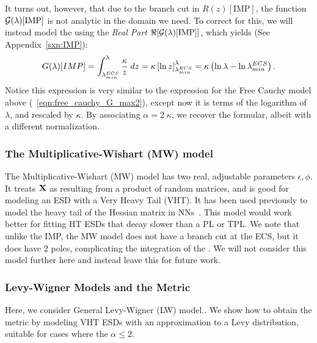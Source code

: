 It turns out, however, that due to the branch cut in $R(z)[\mathrm{IMP}]$,
the function $\mathcal{G(\lambda)}[\mathrm{IMP}]$ is not analytic in the domain we need. 
To correct for this, we will instead model the \LayerQualitySquared using the \emph{Real Part} $\Re[\mathcal{G(\lambda)}[\mathrm{IMP}]]$,
which yields (See Appendix~\ref{sxn:IMP}):
\begin{equation}
  \label{eqn:IMP_model_2}
G(\lambda)[IMP] = \int_{\lambda^{ECS}_{min}}^\lambda \frac{\kappa}{z}\;dz = \kappa \left[ \ln z \right]_{\lambda^{ECS}_{min}}^\lambda = \kappa \left( \ln \lambda - \ln \lambda^{ECS}_{min}\right).
\end{equation}
Notice this expression is very similar to the expression for the Free Cauchy model above (\EQN~\ref{eqn:free_cauchy_G_max2}), except
now it is terms of the logarithm of $\lambda$, and rescaled by $\kappa$.
By associating $\alpha=2\;\kappa$, we recover the \ALPHAHAT formular, albeit with a different normalization.

\subsubsection{The Multiplicative-Wishart (MW) model}
The Multiplicative-Wishart (MW) model  has two real, adjustable parameters $\epsilon,\phi$.
It treats $\mathbf{X}$ as resulting from a product of random matrices, and is good for modeling an ESD with a Very Heavy Tail (VHT).
It has been used previously to model the heavy tail of the Hessian matrix in NNs~\cite{PW16_NIPS}.
This model would work better for fitting HT ESDs that decay slower than a PL or TPL.
We note that unlike the IMP, the MW model does not have a branch cut at the ECS, but it does
have $2$ poles, complicating the integration of the \RTransform.
We will not consider this model further here and instead leave this for future work.


\subsubsection{Levy-Wigner Models and the \ALPHAHAT Metric}
Here, we consider General Levy-Wigner (LW) model..
We show how to obtain the \WW \ALPHAHAT metric by modeling VHT ESDs with an approximation to a Levy distribution, suitable for cases where the \HTSR $\alpha\le 2$.  


